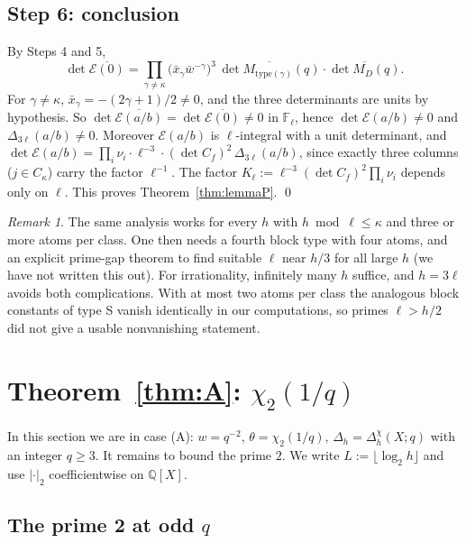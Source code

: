 \documentclass[11pt]{amsart}
\theoremstyle{definition}
\theoremstyle{remark}
\newtheorem{remark}[theorem]{Remark}
\numberwithin{equation}{section}
\newcommand{\QQ}{\mathbb{Q}}
\newcommand{\FF}{\mathbb{F}}
\begin{document}
\subsection{Step 6: conclusion}
By Steps 4 and 5,
\[
  \det\overline{\mathcal E(0)}=\prod_{\gamma\ne\kappa}\bigl(\bar x_\gamma\bar w^{-\gamma}\bigr)^3\,\overline{\det M_{\mathrm{type}(\gamma)}(q)}\cdot\overline{\det M_D(q)} .
\]
For $\gamma\ne\kappa$, $\bar x_\gamma=-(2\gamma+1)/2\ne0$, and the three determinants are units by hypothesis. So
$\det\overline{\mathcal E(a/b)}=\det\overline{\mathcal E(0)}\ne0$ in $\FF_\ell$, hence $\det\mathcal E(a/b)\ne0$ and
$\Delta_{3\ell}(a/b)\ne0$. Moreover $\mathcal E(a/b)$ is $\ell$-integral with a unit determinant, and
$\det\mathcal E(a/b)=\prod_i\nu_i\cdot\ell^{-3}\cdot(\det C_f)^2\,\Delta_{3\ell}(a/b)$, since exactly three columns
($j\in C_\kappa$) carry the factor $\ell^{-1}$. The factor $K_\ell:=\ell^{-3}(\det C_f)^2\prod_i\nu_i$ depends only on $\ell$.
This proves Theorem~\ref{thm:lemmaP}. \qed

\begin{remark}
The same analysis works for every $h$ with $h\bmod\ell\le\kappa$ and three or more atoms per class. One then needs a
fourth block type with four atoms, and an explicit prime-gap theorem to find suitable $\ell$ near $h/3$ for all large
$h$ (we have not written this out). For irrationality, infinitely many $h$ suffice, and $h=3\ell$ avoids both complications. With at
most two atoms per class the analogous block constants of type S vanish identically in our computations, so primes
$\ell>h/2$ did not give a usable nonvanishing statement.
\end{remark}

\section{\texorpdfstring{Theorem~\ref{thm:A}: $\chi_2(1/q)$}{Theorem A: chi2(1/q)}}\label{sec:A}

In this section we are in case (A): $w=q^{-2}$, $\theta=\chi_2(1/q)$, $\Delta_h=\Delta^\chi_h(X;q)$ with an integer $q\ge3$.
It remains to bound the prime $2$. We write $L:=\lfloor\log_2h\rfloor$ and use $|\cdot|_2$ coefficientwise on $\QQ[X]$.

\subsection{The prime 2 at odd \texorpdfstring{$q$}{q}}
\end{document}
